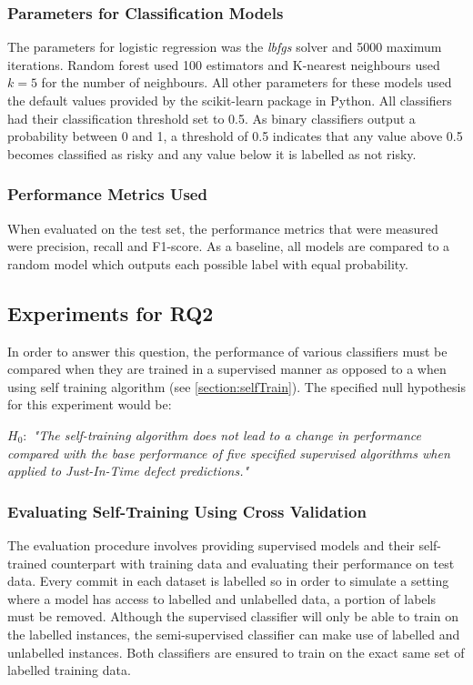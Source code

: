 \documentclass[../main.tex]{subfiles}
\begin{document}
\subsubsection{Parameters for Classification Models}

The parameters for logistic regression was the \textit{lbfgs} solver and 5000 maximum iterations. Random forest used 100 estimators and K-nearest neighbours used $k=5$ for the number of neighbours. All other parameters for these models used the default values provided by the scikit-learn package in Python. All classifiers had their classification threshold set to 0.5. As binary classifiers output a probability between 0 and 1, a threshold of 0.5 indicates that any value above 0.5 becomes classified as risky and any value below it is labelled as not risky. 

\subsubsection{Performance Metrics Used}

When evaluated on the test set, the performance metrics that were measured were precision, recall and F1-score. As a baseline, all models are compared to a random model which outputs each possible label with equal probability. 

\subsection{Experiments for RQ2}

In order to answer this question, the performance of various classifiers must be compared when they are trained in a supervised manner as opposed to a when using self training algorithm (see \ref{section:selfTrain}). The specified null hypothesis for this experiment would be:

\begin{center}
   \textit{$H_0:$ "The self-training algorithm does not lead to a change in performance compared with the base performance of five specified supervised algorithms when applied to Just-In-Time defect predictions."}
\end{center}


\subsubsection{Evaluating Self-Training Using Cross Validation}

The evaluation procedure involves providing supervised models and their self-trained counterpart with training data and evaluating their performance on test data. Every commit in each dataset is labelled so in order to simulate a setting where a model has access to labelled and unlabelled data, a portion of labels must be removed. Although the supervised classifier will only be able to train on the labelled instances, the semi-supervised classifier can make use of labelled and unlabelled instances. Both classifiers are ensured to train on the exact same set of labelled training data. 
\end{document}

